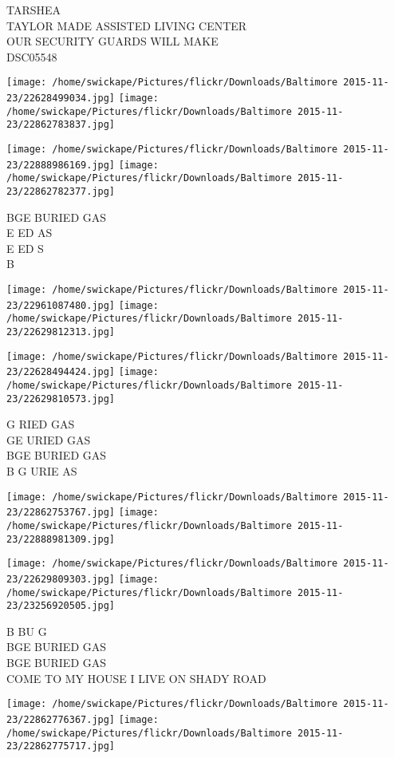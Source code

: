\documentclass[10pt,letterpaper]{article}
\begin{document}
TARSHEA\\
TAYLOR MADE ASSISTED LIVING CENTER\\
OUR SECURITY GUARDS WILL MAKE\\
DSC05548
\pagebreak

\texttt{[image: /home/swickape/Pictures/flickr/Downloads/Baltimore 2015-11-23/22628499034.jpg]}
\texttt{[image: /home/swickape/Pictures/flickr/Downloads/Baltimore 2015-11-23/22862783837.jpg]}

\texttt{[image: /home/swickape/Pictures/flickr/Downloads/Baltimore 2015-11-23/22888986169.jpg]}
\texttt{[image: /home/swickape/Pictures/flickr/Downloads/Baltimore 2015-11-23/22862782377.jpg]}

BGE BURIED GAS\\
E ED AS\\
E ED S\\
B
\pagebreak

\texttt{[image: /home/swickape/Pictures/flickr/Downloads/Baltimore 2015-11-23/22961087480.jpg]}
\texttt{[image: /home/swickape/Pictures/flickr/Downloads/Baltimore 2015-11-23/22629812313.jpg]}

\texttt{[image: /home/swickape/Pictures/flickr/Downloads/Baltimore 2015-11-23/22628494424.jpg]}
\texttt{[image: /home/swickape/Pictures/flickr/Downloads/Baltimore 2015-11-23/22629810573.jpg]}

G RIED GAS\\
GE URIED GAS\\
BGE BURIED GAS\\
B G URIE AS
\pagebreak

\texttt{[image: /home/swickape/Pictures/flickr/Downloads/Baltimore 2015-11-23/22862753767.jpg]}
\texttt{[image: /home/swickape/Pictures/flickr/Downloads/Baltimore 2015-11-23/22888981309.jpg]}

\texttt{[image: /home/swickape/Pictures/flickr/Downloads/Baltimore 2015-11-23/22629809303.jpg]}
\texttt{[image: /home/swickape/Pictures/flickr/Downloads/Baltimore 2015-11-23/23256920505.jpg]}

B BU G\\
BGE BURIED GAS\\
BGE BURIED GAS\\
COME TO MY HOUSE I LIVE ON SHADY ROAD
\pagebreak

\texttt{[image: /home/swickape/Pictures/flickr/Downloads/Baltimore 2015-11-23/22862776367.jpg]}
\texttt{[image: /home/swickape/Pictures/flickr/Downloads/Baltimore 2015-11-23/22862775717.jpg]}
\end{document}
